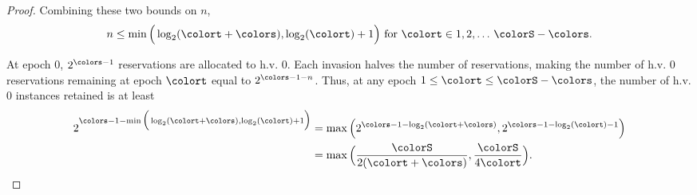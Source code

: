 \begin{proof}
Combining these two bounds on $n$,
\begin{align*}
n \leq
\min\Big(
  \log_2(\colort + \colors),
  \log_2(\colort) + 1
\Big)
\text{ for } \colort \in 1, 2, \ldots \, \colorS - \colors.
\end{align*}

At epoch 0, $2^{\colors - 1}$ reservations are allocated to h.v. 0.
Each invasion halves the number of reservations, making the number of h.v. 0 reservations remaining at epoch $\colort$ equal to $2^{\colors - 1 - n}$.
Thus, at any epoch $1 \leq \colort \leq \colorS - \colors$, the number of h.v. 0 instances retained is at least
\begin{align*}
2^{\colors - 1 - \min\Big(
  \log_2(\colort + \colors),
  \log_2(\colort) + 1
\Big)}
&= \max\Big(
  2^{\colors - 1 - \log_2(\colort + \colors)},
  2^{\colors - 1 - \log_2(\colort) - 1}
\Big)\\
&= \max\Big(
  \frac{\colorS}{2(\colort + \colors)},
  \frac{\colorS}{4\colort}
\Big).
\end{align*}

\end{proof}

